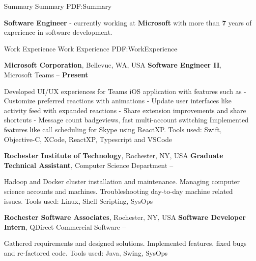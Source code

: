 \documentclass[letterpaper,MMMyyyy,nonstopmode]{simpleresumecv}
\begin{document}
\begin{Body}


\Section
{Summary}
{Summary}
{PDF:Summary}

\Entry
\textbf{Software Engineer} - currently working at \textbf{Microsoft} with more than \textbf{7} years of experience in software development.

\BigGap
\BigGap


\Section
{Work Experience}
{Work Experience}
{PDF:WorkExperience}

\Entry
{\textbf{Microsoft Corporation}, \small{Bellevue, WA, USA}}
\Gap
\BulletItem
\textbf{Software Engineer II}, Microsoft Teams
\hfill
{} -- \textbf{Present}
\begin{Detail}
\SubBulletItem
Developed UI/UX experiences for Teams iOS application with features such as \newline
- Customize preferred reactions with animations \newline
- Update user interfaces like activity feed with expanded reactions \newline
- Share extension improvements and share shortcuts \newline
- Message count badgeviews, fast multi-account switching
\SubBulletItem
Implemented features like call scheduling for Skype using ReactXP.
\SubBulletItem
Tools used: Swift, Objective-C, XCode, ReactXP, Typescript and VSCode
\end{Detail}

\BigGap
\BigGap

\Entry
{\textbf{Rochester Institute of Technology}, \small{Rochester, NY, USA}}
\Gap
\BulletItem
\textbf{Graduate Technical Assistant}, Computer Science Department
\hfill
{} --
\begin{Detail}
\SubBulletItem
Hadoop and Docker cluster installation and maintenance.
\SubBulletItem
Managing computer science accounts and machines.
\SubBulletItem
Troubleshooting day-to-day machine related issues.
\SubBulletItem
Tools used: Linux, Shell Scripting, SysOps
\end{Detail}

\BigGap
\BigGap

\Entry
{\textbf{Rochester Software Associates}, \small{Rochester, NY, USA}}
\Gap
\BulletItem
\textbf{Software Developer Intern}, QDirect Commercial Software
\hfill
{} --
\begin{Detail}
\SubBulletItem
Gathered requirements and designed solutions.
\SubBulletItem
Implemented features, fixed bugs and re-factored code.
\SubBulletItem
Tools used: Java, Swing, SysOps
\end{Detail}



\end{Body}
\end{document}
